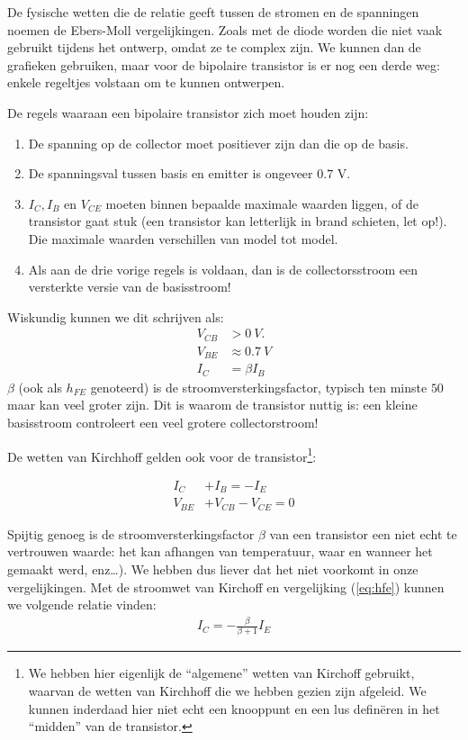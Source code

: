 \documentclass{article}
\begin{document}
				De fysische wetten die de relatie geeft tussen de stromen en de spanningen noemen de Ebers-Moll vergelijkingen. Zoals met de diode worden die niet vaak gebruikt tijdens het ontwerp, omdat ze te complex zijn. We kunnen dan  de grafieken gebruiken, maar voor de bipolaire transistor is er nog een derde weg: enkele regeltjes volstaan om te kunnen ontwerpen. 

				De regels waaraan een bipolaire transistor zich moet houden zijn:
				\begin{enumerate}
					\item De spanning op de collector moet positiever zijn dan die op de basis.
					\item De spanningsval tussen basis en emitter is ongeveer $0.7$ V.
					\item $I_C, I_B$ en $V_{CE} $ moeten binnen bepaalde maximale waarden liggen, of de transistor gaat stuk (een transistor kan letterlijk in brand schieten, let op!). Die maximale waarden verschillen van model tot model.
					\item Als aan de drie vorige regels is voldaan, dan is de collectorsstroom een versterkte versie van de basisstroom!
				\end{enumerate}
				Wiskundig kunnen we dit schrijven als:
					\begin{align}
					    V_{CB} &> 0~V. \\
						V_{BE} &\approx 0.7~V \\
					    I_C &= \beta I_B
					    \label{eq:hfe}
					\end{align}
					$\beta$ (ook als $h_{FE}$ genoteerd) is de stroomversterkingsfactor, typisch ten minste $50$ maar kan veel groter zijn. Dit is waarom de transistor nuttig is: een kleine basisstroom controleert een veel grotere collectorstroom!


				De wetten van Kirchhoff gelden ook voor de transistor\footnote{We hebben hier eigenlijk de ``algemene'' wetten van Kirchoff gebruikt, waarvan de wetten van Kirchhoff die we hebben gezien zijn afgeleid. We kunnen inderdaad hier niet echt een knooppunt en een lus defin\"eren in het ``midden'' van de transistor.}:

				\begin{align}
				    I_C		&+ I_B = -I_E \\
				    V_{BE}  &+ V_{CB} - V_{CE} = 0
				\end{align}

				Spijtig genoeg is de stroomversterkingsfactor $\beta$ van een transistor een niet echt te vertrouwen waarde: het kan afhangen van temperatuur, waar en wanneer het gemaakt werd, enz\ldots). We hebben dus liever dat het niet voorkomt in onze vergelijkingen. Met de stroomwet van Kirchoff en vergelijking (\ref{eq:hfe}) kunnen we volgende relatie vinden:
				\begin{align}
				    I_C = -\frac{\beta}{\beta+1}I_E
				\end{align}
\end{document}
